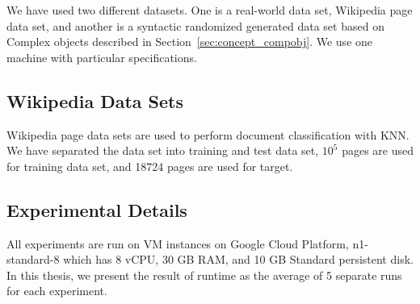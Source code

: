 We have used two different datasets. One is a real-world data set, Wikipedia page data set,
and another is a syntactic randomized generated data set based on Complex objects described in Section~\ref{sec:concept_compobj}. 
We use one machine with particular specifications.
\subsection{Wikipedia Data Sets}
 \label{sec:concept_dataset}
 Wikipedia page data sets are used to perform document classification with KNN. 
 We have separated the data set into training and test data set, 
 \(10^5\) pages are used for training data set, and 18724 pages are used for target.

 \subsection{Experimental Details}
 \label{sec:concept_expdetail}
 All experiments are run on VM instances on Google Cloud Platform, 
 n1-standard-8 which has 8 vCPU, 30 GB RAM, and 10 GB Standard persistent disk.
 In this thesis, we present the result of runtime as the average of 5 separate runs for each experiment.
